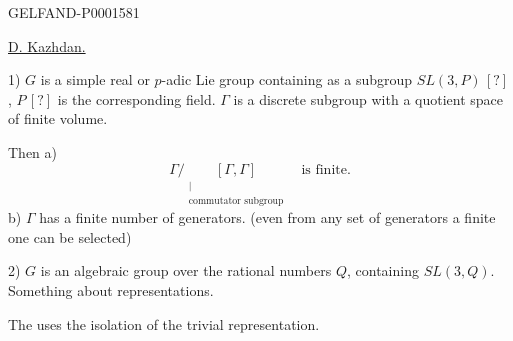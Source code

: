 \begin{GelfandAdjacentEvidence}{GELFAND-P000158}{1}
\hfill{}

\underline{D. Kazhdan.} 

1) $G$ is a simple real or $p$-adic Lie group containing
as a subgroup $SL (3, P)\, [?]$, $P\, [?]$ is the corresponding field.
$\Gamma$ is a discrete subgroup with a quotient space of finite volume.
\end{GelfandAdjacentEvidence}

Then a)
\begin{equation*}
\Gamma/\underset{\substack{\vert\\\text{commutator subgroup}}}{[\Gamma,\Gamma]}\quad\text{is finite}.
\end{equation*}
b) $\Gamma$ has a finite number of generators.
(even from any set of generators a finite one can be selected)


2) $G$ is an algebraic group over the rational numbers $Q$, containing
$SL (3, Q)$.
Something about representations.

The  uses the isolation of the trivial representation.

